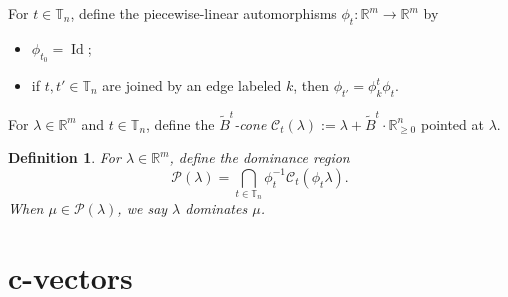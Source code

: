 \documentclass{amsart}
\newtheorem{definition}[theorem]{Definition}
\newtheorem{lemma}[theorem]{Lemma}
\numberwithin{theorem}{section}
\newcommand{\bfc}{\boldsymbol{c}}
\newcommand{\cC}{\mathcal{C}}
\newcommand{\cP}{\mathcal{P}}
\newcommand{\RR}{\mathbb{R}}
\newcommand{\TT}{\mathbb{T}}
\newcommand{\Col}{\operatorname{Col}}
\newcommand{\Id}{\operatorname{Id}}
\begin{document}

  For $t\in\TT_n$, define the piecewise-linear automorphisms $\phi_t:\RR^m\to\RR^m$ by
  \begin{itemize}
    \item $\phi_{t_0}=\Id$;
    \item if $t,t'\in\TT_n$ are joined by an edge labeled $k$, then $\phi_{t'}=\phi^t_k \phi_t$.
  \end{itemize}
  
  For $\lambda\in\RR^m$ and $t\in\TT_n$, define the \emph{$\tilde B^t$-cone} $\cC_t(\lambda):=\lambda+\tilde B^t\cdot\RR_{\ge0}^n$ pointed at $\lambda$.

  \begin{definition}
    For $\lambda\in\RR^m$, define the \emph{dominance region} 
    \[
      \cP(\lambda) = \bigcap_{t\in\TT_n} \phi_t^{-1} \cC_t(\phi_t \lambda).
    \]
    When $\mu\in\cP(\lambda)$, we say \emph{$\lambda$ dominates $\mu$}.
  \end{definition}


  \section{$\bfc$-vectors}
\end{document}
